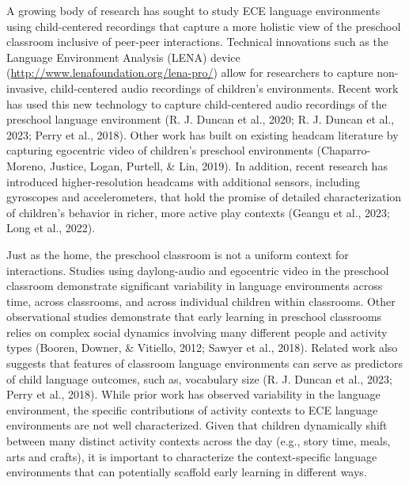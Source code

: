 \documentclass[10pt, letterpaper]{article}
\begin{document}
A growing body of research has sought to study ECE language environments
using child-centered recordings that capture a more holistic view of the
preschool classroom inclusive of peer-peer interactions. Technical
innovations such as the Language Environment Analysis (LENA) device
(\url{http://www.lenafoundation.org/lena-pro/}) allow for researchers to
capture non-invasive, child-centered audio recordings of children's
environments. Recent work has used this new technology to capture
child-centered audio recordings of the preschool language environment
(R. J. Duncan et al., 2020; R. J. Duncan et al., 2023; Perry et al.,
2018). Other work has built on existing headcam literature by capturing
egocentric video of children's preschool environments (Chaparro-Moreno,
Justice, Logan, Purtell, \& Lin, 2019). In addition, recent research has
introduced higher-resolution headcams with additional sensors, including
gyroscopes and accelerometers, that hold the promise of detailed
characterization of children's behavior in richer, more active play
contexts (Geangu et al., 2023; Long et al., 2022).

Just as the home, the preschool classroom is not a uniform context for
interactions. Studies using daylong-audio and egocentric video in the
preschool classroom demonstrate significant variability in language
environments across time, across classrooms, and across individual
children within classrooms. Other observational studies demonstrate that
early learning in preschool classrooms relies on complex social dynamics
involving many different people and activity types (Booren, Downer, \&
Vitiello, 2012; Sawyer et al., 2018). Related work also suggests that
features of classroom language environments can serve as predictors of
child language outcomes, such as, vocabulary size (R. J. Duncan et al.,
2023; Perry et al., 2018). While prior work has observed variability in
the language environment, the specific contributions of activity
contexts to ECE language environments are not well characterized. Given
that children dynamically shift between many distinct activity contexts
across the day (e.g., story time, meals, arts and crafts), it is
important to characterize the context-specific language environments
that can potentially scaffold early learning in different ways.
\end{document}
